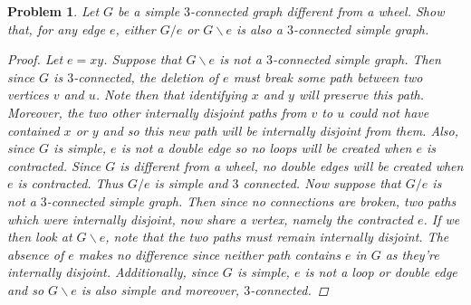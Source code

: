 \documentclass{article}
\newtheorem{problem}{Problem}
\begin{document}
\begin{problem}
Let $G$ be a simple $3$-connected graph different from a wheel. Show that, for any edge $e$, either $G / e$ or $G \backslash e$ is also a $3$-connected simple graph.
\begin{proof}
Let $e = xy$. Suppose that $G \backslash e$ is not a $3$-connected simple graph. Then since $G$ is $3$-connected, the deletion of $e$ must break some path between two vertices $v$ and $u$. Note then that identifying $x$ and $y$ will preserve this path. Moreover, the two other internally disjoint paths from $v$ to $u$ could not have contained $x$ or $y$ and so this new path will be internally disjoint from them. Also, since $G$ is simple, $e$ is not a double edge so no loops will be created when $e$ is contracted. Since $G$ is different from a wheel, no double edges will be created when $e$ is contracted. Thus $G / e$ is simple and $3$ connected.
Now suppose that $G / e$ is not a $3$-connected simple graph. Then since no connections are broken, two paths which were internally disjoint, now share a vertex, namely the contracted $e$. If we then look at $G \backslash e$, note that the two paths must remain internally disjoint. The absence of $e$ makes no difference since neither path contains $e$ in $G$ as they're internally disjoint. Additionally, since $G$ is simple, $e$ is not a loop or double edge and so $G \backslash e$ is also simple and moreover, $3$-connected.
\end{proof}
\end{problem}
\end{document}
